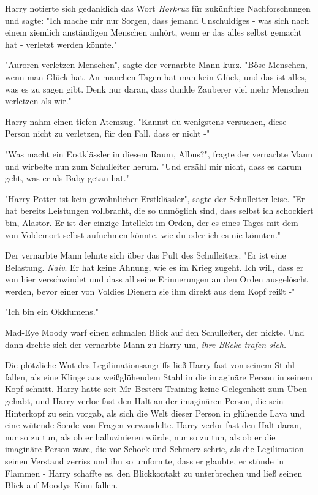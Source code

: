 {Harry notierte sich gedanklich das Wort \emph{Horkrux} für zukünftige Nachforschungen und sagte: "Ich mache mir nur Sorgen, dass jemand Unschuldiges - was sich nach einem ziemlich anständigen Menschen anhört, wenn er das alles selbst gemacht hat - verletzt werden könnte."

"Auroren verletzen Menschen", sagte der vernarbte Mann kurz. "Böse Menschen, wenn man Glück hat. An manchen Tagen hat man kein Glück, und das ist alles, was es zu sagen gibt. Denk nur daran, dass dunkle Zauberer viel mehr Menschen verletzen als wir."

Harry nahm einen tiefen Atemzug. "Kannst du wenigstens versuchen, diese Person nicht zu verletzen, für den Fall, dass er nicht -"

"Was macht ein Erstklässler in diesem Raum, Albus?", fragte der vernarbte Mann und wirbelte nun zum Schulleiter herum. "Und erzähl mir nicht, dass es darum geht, was er als Baby getan hat."

"Harry Potter ist kein gewöhnlicher Erstklässler", sagte der Schulleiter leise. "Er hat bereits Leistungen vollbracht, die so unmöglich sind, dass selbst ich schockiert bin, Alastor. Er ist der einzige Intellekt im Orden, der es eines Tages mit dem von Voldemort selbst aufnehmen könnte, wie du oder ich es nie könnten."

Der vernarbte Mann lehnte sich über das Pult des Schulleiters. "Er ist eine Belastung. \emph{Naiv}. Er hat keine Ahnung, wie es im Krieg zugeht. Ich will, dass er von hier verschwindet und dass all seine Erinnerungen an den Orden ausgelöscht werden, bevor einer von Voldies Dienern sie ihm direkt aus dem Kopf reißt -"

"Ich bin ein Okklumens."

Mad-Eye Moody warf einen schmalen Blick auf den Schulleiter, der nickte. Und dann drehte sich der vernarbte Mann zu Harry um, \emph{ihre Blicke trafen sich.}

Die plötzliche Wut des Legilimationsangriffs ließ Harry fast von seinem Stuhl fallen, als eine Klinge aus weißglühendem Stahl in die imaginäre Person in seinem Kopf schnitt. Harry hatte seit Mr~Besters Training keine Gelegenheit zum Üben gehabt, und Harry verlor fast den Halt an der imaginären Person, die sein Hinterkopf zu sein vorgab, als sich die Welt dieser Person in glühende Lava und eine wütende Sonde von Fragen verwandelte. Harry verlor fast den Halt daran, nur so zu tun, als ob er halluzinieren würde, nur so zu tun, als ob er die imaginäre Person wäre, die vor Schock und Schmerz schrie, als die Legilimation seinen Verstand zerriss und ihn so umformte, dass er glaubte, er stünde in Flammen - Harry schaffte es, den Blickkontakt zu unterbrechen und ließ seinen Blick auf Moodys Kinn fallen.

}
